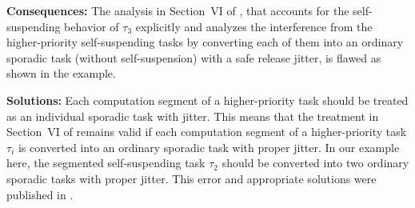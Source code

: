 {\bf Consequences:} The analysis in Section~VI of
\cite{ecrts15nelissen}, that accounts for the self-suspending behavior
of $\tau_3$ explicitly and analyzes the interference from the
higher-priority self-suspending tasks by converting each of them into
an ordinary sporadic task (without self-suspension) with a safe
release jitter, is flawed as shown in the example.

{\bf Solutions:} Each computation segment of a higher-priority task
should be treated as an individual sporadic task with jitter. This means that
the treatment in Section~VI of \cite{ecrts15nelissen} remains valid
if each computation segment of a higher-priority task $\tau_i$ is
converted into an ordinary sporadic task with proper jitter. In our example here, the segmented self-suspending task $\tau_2$ should be converted into two ordinary sporadic tasks with proper jitter. This error and appropriate solutions were published in \cite{nelissen-errata-ECRTS15}.


